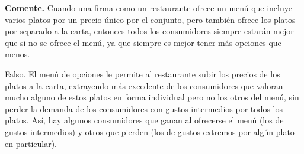 \question \textbf{Comente.} Cuando una firma como un restaurante ofrece un menú que incluye varios platos por un precio único por el conjunto, pero también ofrece los platos por separado a la carta, entonces todos los consumidores siempre estarán mejor que si no se ofrece el menú, ya que siempre es mejor tener más opciones que menos.
\begin{solution}
Falso. El menú de opciones le permite al restaurante subir los precios de los platos a la carta, extrayendo más excedente de los consumidores que valoran mucho alguno de estos platos en forma individual pero no los otros del menú, sin perder la demanda de los consumidores con gustos intermedios por todos los platos. Así, hay algunos consumidores que ganan al ofrecerse el menú (los de gustos intermedios) y otros que pierden (los de gustos extremos por algún plato en particular).

\end{solution}

